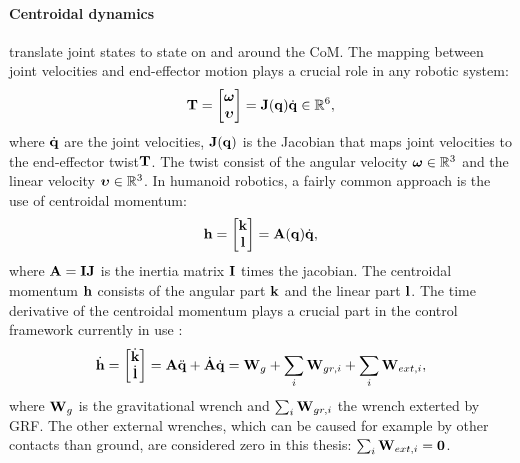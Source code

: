 \paragraph{Centroidal dynamics} \cite{orin2013centroidal} translate joint states to state on and around the \ac{CoM}. The  mapping between joint velocities and end-effector motion plays a crucial role in any robotic system:
\begin{equation}\label{eq:jacobian}
\mathbf{T}=\begin{bmatrix}\boldsymbol{\omega} \\ \boldsymbol{\upsilon} \end{bmatrix} = \mathbf{J}(\mathbf{q})\dot{\mathbf{q}} \in \mathbb{R}^6,
\end{equation}
where $\dot{\mathbf{q}}$ are the joint velocities, $\mathbf{J}(\mathbf{q})$ is the Jacobian that maps joint velocities to the end-effector twist$\mathbf{T}$. The twist consist of the angular velocity $\boldsymbol{\omega} \in \mathbb{R}^3$ and the linear velocity $\boldsymbol{\upsilon} \in \mathbb{R}^3$. In humanoid robotics, a fairly common approach is the use of centroidal momentum:
\begin{equation}
\mathbf{h}=\begin{bmatrix}\mathbf{k} \\ \mathbf{l} \end{bmatrix} =\mathbf{A}(\mathbf{q})\dot{\mathbf{q}},
\end{equation}
 where $\mathbf{A}=\mathbf{I}\mathbf{J}$ is the inertia matrix $\mathbf{I}$ times the jacobian. The centroidal momentum $\mathbf{h}$ consists of the angular part $\mathbf{k}$ and the linear part $\mathbf{l}$. The time derivative of the centroidal momentum plays a crucial part in the control framework currently in use \cite{koolen2016design}:
\begin{equation}
\dot{\mathbf{h}}=\begin{bmatrix}\dot{\mathbf{k}}\\ \dot{\mathbf{l}} \end{bmatrix} =\mathbf{A}\ddot{\mathbf{q}} +\dot{\mathbf{A}}\dot{\mathbf{q}} = \mathbf{W}_g + \sum_i\mathbf{W}_{gr,i} + \sum_i \mathbf{W}_{ext,i}, 
\end{equation}
where $\mathbf{W}_g$ is the gravitational wrench and $\sum_i\mathbf{W}_{gr,i}$ the wrench exterted by \ac{GRF}. The other external wrenches, which can be caused for example by other contacts than ground, are considered zero in this thesis: $\sum_i \mathbf{W}_{ext,i}=\mathbf{0}$.
